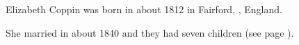 
Elizabeth Coppin was born in about 1812 in Fairford, , England.\cite{Census1861Merrett}

She married  in about 1840\cite{PeterKarpinski_2016-04-04} and they had seven children (see page \pageref{James_Merrett}).
